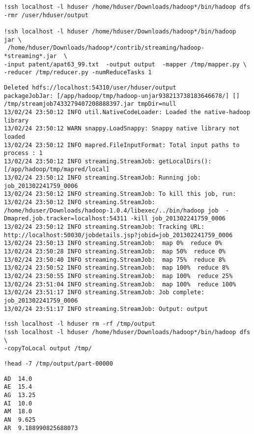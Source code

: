 \documentclass[12pt,fleqn]{article}\usepackage{../common}
\begin{document}
\begin{verbatim}
!ssh localhost -l hduser /home/hduser/Downloads/hadoop*/bin/hadoop dfs -rmr /user/hduser/output

!ssh localhost -l hduser /home/hduser/Downloads/hadoop*/bin/hadoop  jar \
 /home/hduser/Downloads/hadoop*/contrib/streaming/hadoop-*streaming*.jar  \
-input patent/apat63_99.txt  -output output  -mapper /tmp/mapper.py \
-reducer /tmp/reducer.py -numReduceTasks 1 
\end{verbatim}

\begin{verbatim}
Deleted hdfs://localhost:54310/user/hduser/output
packageJobJar: [/app/hadoop/tmp/hadoop-unjar938213738183646678/] [] /tmp/streamjob7433279407208888397.jar tmpDir=null
13/02/24 23:50:12 INFO util.NativeCodeLoader: Loaded the native-hadoop library
13/02/24 23:50:12 WARN snappy.LoadSnappy: Snappy native library not loaded
13/02/24 23:50:12 INFO mapred.FileInputFormat: Total input paths to process : 1
13/02/24 23:50:12 INFO streaming.StreamJob: getLocalDirs(): [/app/hadoop/tmp/mapred/local]
13/02/24 23:50:12 INFO streaming.StreamJob: Running job: job_201302241759_0006
13/02/24 23:50:12 INFO streaming.StreamJob: To kill this job, run:
13/02/24 23:50:12 INFO streaming.StreamJob: /home/hduser/Downloads/hadoop-1.0.4/libexec/../bin/hadoop job  -Dmapred.job.tracker=localhost:54311 -kill job_201302241759_0006
13/02/24 23:50:12 INFO streaming.StreamJob: Tracking URL: http://localhost:50030/jobdetails.jsp?jobid=job_201302241759_0006
13/02/24 23:50:13 INFO streaming.StreamJob:  map 0%  reduce 0%
13/02/24 23:50:28 INFO streaming.StreamJob:  map 50%  reduce 0%
13/02/24 23:50:40 INFO streaming.StreamJob:  map 75%  reduce 8%
13/02/24 23:50:52 INFO streaming.StreamJob:  map 100%  reduce 8%
13/02/24 23:50:55 INFO streaming.StreamJob:  map 100%  reduce 25%
13/02/24 23:51:04 INFO streaming.StreamJob:  map 100%  reduce 100%
13/02/24 23:51:17 INFO streaming.StreamJob: Job complete: job_201302241759_0006
13/02/24 23:51:17 INFO streaming.StreamJob: Output: output
\end{verbatim}

\begin{verbatim}
!ssh localhost -l hduser rm -rf /tmp/output
!ssh localhost -l hduser /home/hduser/Downloads/hadoop*/bin/hadoop dfs  \
-copyToLocal output /tmp/
\end{verbatim}

\begin{verbatim}
!head -7 /tmp/output/part-00000
\end{verbatim}

\begin{verbatim}
AD	14.0
AE	15.4
AG	13.25
AI	10.0
AM	18.0
AN	9.625
AR	9.188990825688073
\end{verbatim}
\end{document}
